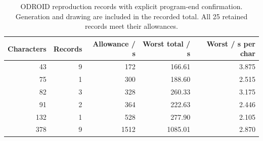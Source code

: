 \begin{table}[!htbp]\centering\small
\begin{tabular}{rrrrr}\toprule
\textbf{Characters} & \textbf{Records} & \textbf{Allowance / s} & \textbf{Worst total / s} & \textbf{Worst / s per char}\\\midrule
43 & 9 & 172 & 166.61 & 3.875\\
75 & 1 & 300 & 188.60 & 2.515\\
82 & 3 & 328 & 260.33 & 3.175\\
91 & 2 & 364 & 222.63 & 2.446\\
132 & 1 & 528 & 277.90 & 2.105\\
378 & 9 & 1512 & 1085.01 & 2.870\\
\bottomrule\end{tabular}
\caption{ODROID reproduction records with explicit program-end confirmation. Generation and drawing are included in the recorded total. All 25 retained records meet their allowances.}\label{tab:res-r3-confirmed}
\end{table}
